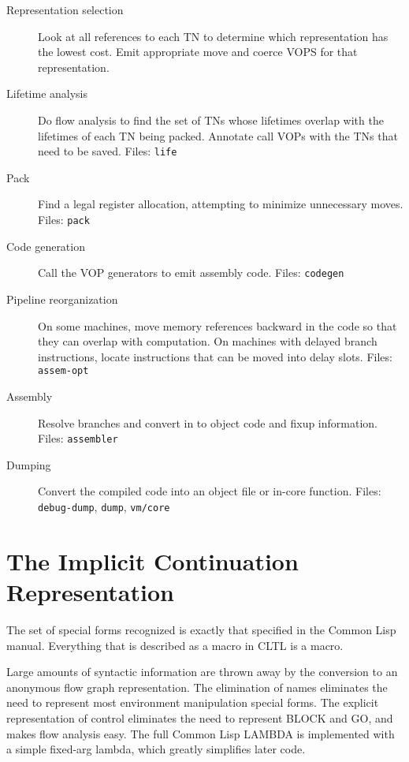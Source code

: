 \begin{description}
\item[Representation selection]
Look at all references to each TN to determine which representation has the
lowest cost.  Emit appropriate move and coerce VOPS for that representation.

\item[Lifetime analysis]
Do flow analysis to find the set of TNs whose lifetimes 
overlap with the lifetimes of each TN being packed.  Annotate call VOPs with
the TNs that need to be saved.  Files: {\tt life}

\item[Pack]
Find a legal register allocation, attempting to minimize unnecessary moves.
Files: {\tt pack}

\item[Code generation]
Call the VOP generators to emit assembly code.  Files: {\tt codegen}

\item[Pipeline reorganization] On some machines, move memory references
backward in the code so that they can overlap with computation.  On machines
with delayed branch instructions, locate instructions that can be moved into
delay slots.  Files: {\tt assem-opt}

\item[Assembly]
Resolve branches and convert in to object code and fixup information.
Files: {\tt assembler}

\item[Dumping] Convert the compiled code into an object file or in-core
function.  Files: {\tt debug-dump}, {\tt dump}, {\tt vm/core}

\end{description}

\chapter{The Implicit Continuation Representation}

The set of special forms recognized is exactly that specified in the Common
Lisp manual.  Everything that is described as a macro in CLTL is a macro.

Large amounts of syntactic information are thrown away by the conversion to an
anonymous flow graph representation.  The elimination of names eliminates the
need to represent most environment manipulation special forms.  The explicit
representation of control eliminates the need to represent BLOCK and GO, and
makes flow analysis easy.  The full Common Lisp LAMBDA is implemented with a
simple fixed-arg lambda, which greatly simplifies later code.
      
